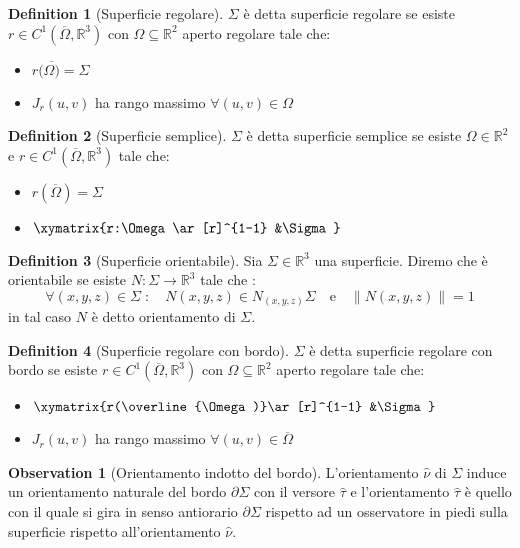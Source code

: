 \documentclass[leqno]{article}
\theoremstyle{definition}
\newtheorem{definition}{Definition}[section]
\numberwithin{equation}{section}
\newtheorem{observation}[theorem]{Observation}
\theoremstyle{remark}
\begin{document}
	\begin{definition}[Superficie regolare]
		$\Sigma$ è detta superficie regolare se esiste $r\in C^1(\overline{\Omega}, \mathbb{R}^3)$ con $\Omega \subseteq \mathbb{R}^2$ aperto regolare tale che:
		\begin{itemize}
			\item $r(\overline{\Omega)}=\Sigma$
			\item $J_r(u,v)$ ha rango massimo $\forall (u,v)\in \Omega$
		\end{itemize}
	\end{definition}
	
	\begin{definition}[Superficie semplice]
		$\Sigma$ è detta superficie semplice se esiste $\Omega \in \mathbb{R}^2$ e $r\in C^1(\overline{\Omega},\mathbb{R}^3)$ tale che:
		\begin{itemize}
			\item $r(\overline{\Omega})=\Sigma$
			\item $\xymatrix{r:\Omega \ar[r]^{1-1} &\Sigma}$
		\end{itemize}
	\end{definition}
	
	\begin{definition}[Superficie orientabile]
		Sia $\Sigma \in \mathbb{R}^3 $ una superficie. Diremo che è   orientabile se esiste $N:\Sigma \to \mathbb{R}^3$ tale che :
		\begin{equation}
			\forall(x,y,z)\in \Sigma \; : \quad N(x,y,z)\in N_{(x,y,z)}\Sigma \quad \text{e} \quad \lVert N(x,y,z) \rVert = 1
		\end{equation}
		in tal caso $N$ è detto orientamento di $\Sigma$.
	\end{definition}
	
	\begin{definition}[Superficie regolare con bordo]
		$\Sigma$ è detta superficie regolare con bordo se esiste $r\in C^1(\overline{\Omega}, \mathbb{R}^3)$ con $\Omega \subseteq \mathbb{R}^2$ aperto regolare tale che:
		\begin{itemize}
			\item $\xymatrix{r(\overline{\Omega)}\ar[r]^{1-1} &\Sigma}$
			\item $J_r(u,v)$ ha rango massimo $\forall (u,v)\in \overline{\Omega}$
		\end{itemize}
	\end{definition}
	
	\begin{observation}[Orientamento indotto del bordo]
		L'orientamento $\hat{\nu}$ di $\Sigma$ induce un orientamento naturale del bordo $\partial \Sigma$ con il versore $\hat{\tau}$ e l'orientamento $\hat{\tau}$ è quello con il quale si gira in senso antiorario $\partial\Sigma$ rispetto ad un osservatore in piedi sulla superficie rispetto all'orientamento $\hat{\nu}$.
	\end{observation}
	
\end{document}

